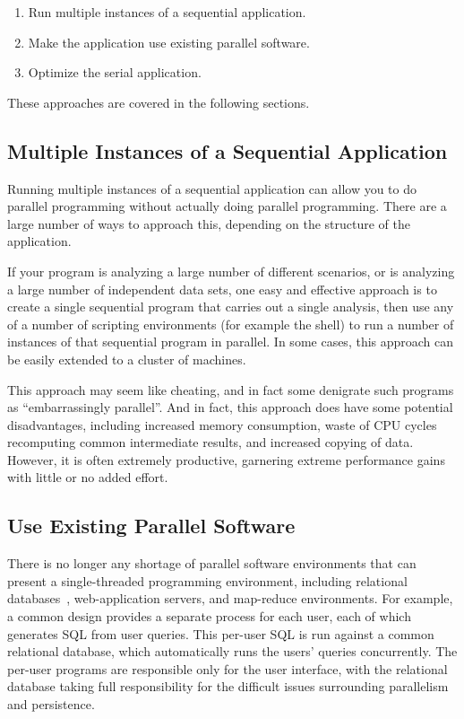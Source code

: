 \begin{enumerate}
\item	Run multiple instances of a sequential application.
\item	Make the application use existing parallel software.
\item	Optimize the serial application.
\end{enumerate}

These approaches are covered in the following sections.

\subsection{Multiple Instances of a Sequential Application}
\label{sec:intro:Multiple Instances of a Sequential Application}

Running multiple instances of a sequential application can allow you
to do parallel programming without actually doing parallel programming.
There are a large number of ways to approach this, depending on the
structure of the application.

If your program is analyzing a large number of different scenarios,
or is analyzing a large number of independent data sets, one easy
and effective approach is to create a single sequential program that
carries out a single analysis, then use any of a number of scripting
environments (for example the  shell) to run a number of
instances of that sequential program in parallel.
In some cases, this approach can be easily extended to a cluster of
machines.

This approach may seem like cheating, and in fact some denigrate such
programs as ``embarrassingly parallel''.
And in fact, this approach does have some potential disadvantages,
including increased memory consumption, waste of CPU cycles recomputing
common intermediate results, and increased copying of data.
However, it is often  extremely productive, garnering extreme performance
gains with little or no added effort.

\subsection{Use Existing Parallel Software}
\label{sec:intro:Use Existing Parallel Software}

There is no longer any shortage of parallel software environments that
can present a single-threaded programming environment,
including relational
databases~\cite{Date82},
web-application servers, and map-reduce environments.
For example, a common design provides a separate process for each
user, each of which generates SQL from user queries.
This per-user SQL is run against a common relational database, which
automatically runs the users' queries concurrently.
The per-user programs are responsible only for the user interface,
with the relational database taking full responsibility for the
difficult issues surrounding parallelism and persistence.

